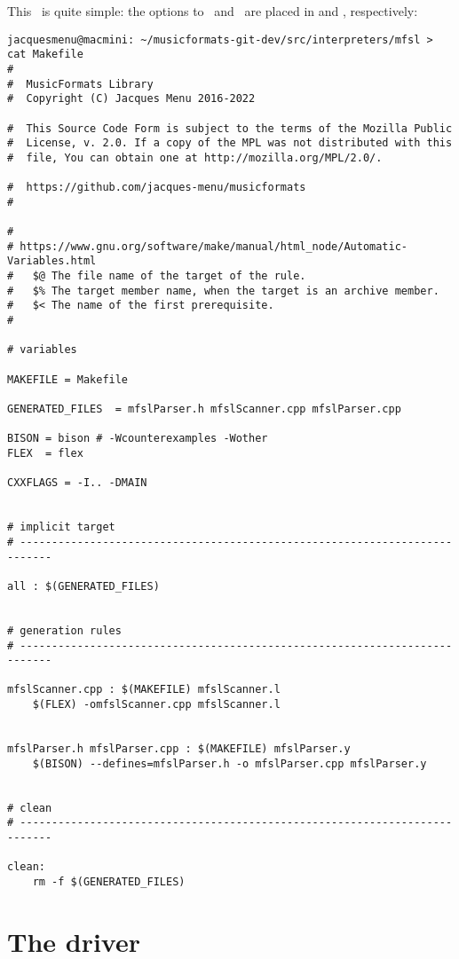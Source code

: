This \Makefile\ is quite simple: the options to \flex\ and \bison\ are placed in  and , respectively:
\begin{lstlisting}[language=Terminal]
jacquesmenu@macmini: ~/musicformats-git-dev/src/interpreters/mfsl > cat Makefile 
#
#  MusicFormats Library
#  Copyright (C) Jacques Menu 2016-2022

#  This Source Code Form is subject to the terms of the Mozilla Public
#  License, v. 2.0. If a copy of the MPL was not distributed with this
#  file, You can obtain one at http://mozilla.org/MPL/2.0/.

#  https://github.com/jacques-menu/musicformats
#

#
# https://www.gnu.org/software/make/manual/html_node/Automatic-Variables.html
#   $@ The file name of the target of the rule.
#   $% The target member name, when the target is an archive member.
#   $< The name of the first prerequisite.
#

# variables

MAKEFILE = Makefile

GENERATED_FILES  = mfslParser.h mfslScanner.cpp mfslParser.cpp

BISON = bison # -Wcounterexamples -Wother
FLEX  = flex

CXXFLAGS = -I.. -DMAIN


# implicit target
# ---------------------------------------------------------------------------

all : $(GENERATED_FILES)


# generation rules
# ---------------------------------------------------------------------------

mfslScanner.cpp : $(MAKEFILE) mfslScanner.l
	$(FLEX) -omfslScanner.cpp mfslScanner.l


mfslParser.h mfslParser.cpp : $(MAKEFILE) mfslParser.y
	$(BISON) --defines=mfslParser.h -o mfslParser.cpp mfslParser.y


# clean
# ---------------------------------------------------------------------------

clean:
	rm -f $(GENERATED_FILES)
\end{lstlisting}


\section{The driver}

